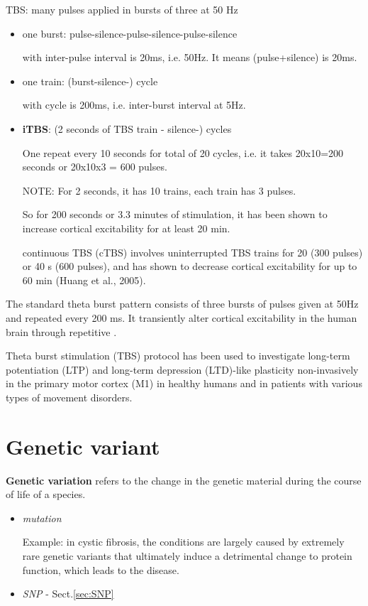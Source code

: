 TBS: many pulses applied in bursts of three at 50 Hz
\begin{itemize}
  \item one burst: pulse-silence-pulse-silence-pulse-silence
  
  with inter-pulse interval is 20ms, i.e. 50Hz.
  It means (pulse+silence) is 20ms.
  
  \item one train: (burst-silence-) cycle
  
  with cycle is 200ms, i.e. inter-burst interval at 5Hz.
  
  
  \item {\bf iTBS}: (2 seconds of TBS train - silence-) cycles
  
  One repeat every 10 seconds for total of 20 cycles, i.e. it takes 20x10=200
  seconds or  20x10x3 = 600 pulses. 
 
  NOTE:  For 2 seconds, it has 10 trains, each train has 3 pulses.
  
  So for 200 seconds or 3.3 minutes of stimulation, it has
  been shown to increase cortical excitability for at least 20 min.
  
  continuous TBS (cTBS) involves uninterrupted TBS trains for 20 (300 pulses) or
  40 s (600 pulses), and has shown to decrease cortical excitability for up to
60 min (Huang et al., 2005).
  
\end{itemize}

The standard theta burst pattern consists of three bursts of pulses given at
50Hz and repeated every 200 ms. It transiently alter cortical excitability in
the human brain through repetitive .

Theta burst stimulation (TBS) protocol has been used to investigate long-term
potentiation (LTP) and long-term depression (LTD)-like plasticity non-invasively
in the primary motor cortex (M1) in healthy humans and in patients with various
types of movement disorders.



\section{Genetic variant}
\label{sec:genetic-variant}

{\bf Genetic variation} refers to the change in the genetic material during the
course of life of a species.
\begin{itemize}
  \item {\it mutation}
  
 Example: in cystic fibrosis, the conditions are largely caused by extremely
 rare genetic variants that ultimately induce a detrimental change to protein
 function, which leads to the disease.

  
  \item {\it SNP} - Sect.\ref{sec:SNP}
\end{itemize}

